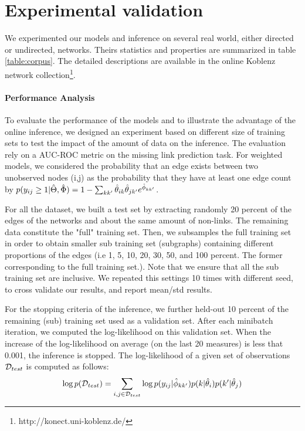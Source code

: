 \section{Experimental validation}
\label{sec:exps}

%
%


We experimented our models and inference on several real world, either directed or undirected, networks. Theirs statistics and properties are summarized in table \ref{table:corpus}. The detailed descriptions are available in the online Koblenz network collection\footnote{http://konect.uni-koblenz.de/}.

\begin{table}[h]
\bgroup
\def\arraystretch{1} %
	
\egroup
\label{table:corpus}
\end{table}



%
%
\paragraph{Performance Analysis} To evaluate the performance of the models and to illustrate the advantage of the online inference, we designed an experiment based on different size of training sets to test the impact of the amount of data on the inference. The evaluation rely on a AUC-ROC metric on the missing link prediction task. For weighted models, we considered the probability that an edge exists between two unobserved nodes (i,j) as the probability that they have at least one edge count by $p(y_{ij} \geq 1 | \hat\Theta, \hat\Phi) = 1 - \sum_{kk'} \hat\theta_{ik} \hat\theta_{jk'} e^{\hat\phi_{kk'}}$.

For all the dataset, we  built a test set by extracting randomly 20 percent of the edges of the networks and about the same amount of non-links. The remaining data constitute the "full" training set. Then, we subsamples the full training set in order to obtain smaller sub training set (subgraphs) containing different proportions of the edges (i.e 1, 5, 10, 20, 30, 50, and 100 percent. The former corresponding to the full training set.). Note that we ensure that all the sub training set are inclusive. We repeated this settings 10 times with different seed, to cross validate our results, and report mean/std results.

For the stopping criteria of the inference, we further held-out 10 percent of the remaining (sub) training set used as a validation set. After each minibatch iteration, we computed the log-likelihood on this validation set. When the increase of the log-likelihood on average (on the last 20 measures) is less that 0.001, the inference is stopped. The log-likelihood of a given set of observations $\mathcal{D}_{test}$  is computed as follows:
\begin{equation*}
\log p(\mathcal{D}_{test}) = \sum_{i,j \in \mathcal{D}_{test}} \log p(y_{ij} | \hat\phi_{kk'}) p(k|\hat\theta_i) p(k'|\hat\theta_j)
\end{equation*}

